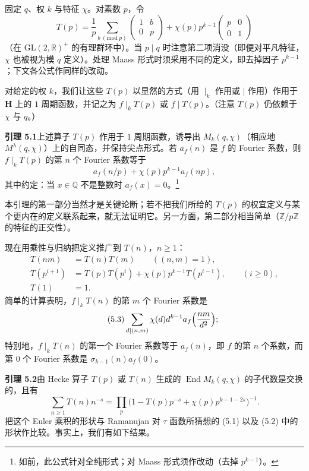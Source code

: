 固定 $q$、权 $k$ 与特征 $\chi$。对素数 $p$，令
\[
T(p)=\frac{1}{p}\sum_{b\ (\mathrm{mod}\ p)}\begin{pmatrix}1&b\\0&p\end{pmatrix}+\chi(p)p^{k-1}\begin{pmatrix}p&0\\0&1\end{pmatrix}
\]
（在 $\mathrm{GL}(2,\mathbb{R})^{+}$ 的有理群环中）。当 $p\mid q$ 时注意第二项消没（即便对平凡特征，$\chi$ 也被视为模 $q$ 定义）。处理 Maass 形式时须采用不同的定义，即去掉因子 $p^{k-1}$；下文各公式作同样的改动。

对给定的权 $k$，我们让这些 $T(p)$ 以显然的方式（用 $\mid_k$ 作用或 $\mid$ 作用）作用于 $\mathbf{H}$ 上的 $1$ 周期函数，并记之为 $f\mid_{k}T(p)$ 或 $f\mid T(p)$。（注意 $T(p)$ 仍依赖于 $\chi$ 与 $q$。）

\par\medskip\noindent\textbf{引理 5.1}\quad 上述算子 $T(p)$ 作用于 $1$ 周期函数，诱导出 $M_{k}(q,\chi)$（相应地 $M^{\lambda}(q,\chi)$）上的自同态，并保持尖点形式。若 $a_{f}(n)$ 是 $f$ 的 Fourier 系数，则 $f\mid_{k}T(p)$ 的第 $n$ 个 Fourier 系数等于
\[
a_{f}(n/p)+\chi(p)p^{k-1}a_{f}(np),
\]
其中约定：当 $x\in\mathbb{Q}$ 不是整数时 $a_{f}(x)=0$。\footnote{如前，此公式针对全纯形式；对 Maass 形式须作改动（去掉 $p^{k-1}$）。}

本引理的第一部分当然才是关键论断；若不把我们所给的 $T(p)$ 的权宜定义与某个更内在的定义联系起来，就无法证明它。另一方面，第二部分相当简单（$\mathbb{Z}/p\mathbb{Z}$ 的特征的正交性）。

现在用乘性与归纳把定义推广到 $T(n)$，$n\ge1$：
\begin{align*}
T(nm)&=T(n)T(m)\qquad((n,m)=1),\\
T(p^{i+1})&=T(p)T(p^{i})+\chi(p)p^{k-1}T(p^{i-1}),\qquad(i\ge0),\\
T(1)&=1.
\end{align*}
简单的计算表明，$f\mid_{k}T(n)$ 的第 $m$ 个 Fourier 系数是
\begin{equation}\tag{5.3}\label{c3:eq:5.3}
\sum_{d\mid(n,m)}\chi(d)d^{k-1}a_{f}\Bigl(\frac{nm}{d^{2}}\Bigr);
\end{equation}
特别地，$f\mid_{k}T(n)$ 的第一个 Fourier 系数等于 $a_{f}(n)$，即 $f$ 的第 $n$ 个系数，而第 $0$ 个 Fourier 系数是 $\sigma_{k-1}(n)a_{f}(0)$。

\par\medskip\noindent\textbf{引理 5.2}\quad 由 Hecke 算子 $T(p)$ 或 $T(n)$ 生成的 $\operatorname{End}M_{k}(q,\chi)$ 的子代数是交换的，且有
\[
\sum_{n\ge1}T(n)n^{-s}=\prod_{p}\bigl(1-T(p)p^{-s}+\chi(p)p^{k-1-2s}\bigr)^{-1}.
\]
把这个 Euler 乘积的形状与 Ramanujan 对 $\tau$ 函数所猜想的 (5.1) 以及 (5.2) 中的形状作比较。事实上，我们有如下结果。

